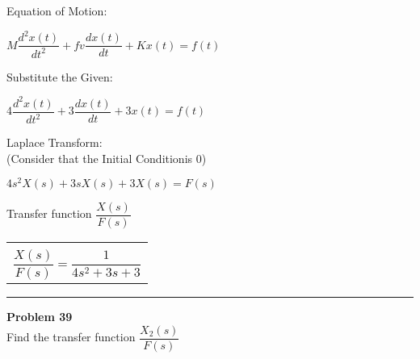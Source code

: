 \documentclass[11pt,letterpaper]{article}
\begin{document}
Equation of Motion:\\
\begin{center}
	$M\dfrac{d^2x(t)}{dt^2}+fv\dfrac{dx(t)}{dt}+Kx(t)=f(t)$\\[12pt]
\end{center}
Substitute the Given:\\
\begin{center}
	$4\dfrac{d^2x(t)}{dt^2}+3\dfrac{dx(t)}{dt}+3x(t)=f(t)$\\[12pt]
\end{center}
Laplace Transform:\\[12pt]
(Consider that the Initial Conditionis 0)\\
\begin{center}
	$4s^2X(s)+3sX(s)+3X(s)=F(s)$\\[12pt]
\end{center}
Transfer function $\dfrac{X(s)}{F(s)}$\\
\begin{center}
	\begin{tabular}{|c|}
		\hline \\
		$\dfrac{X(s)}{F(s)}=\dfrac{1}{4s^2+3s+3}$	\\ [12pt]
	\hline
	\end{tabular}	
\end{center}

\clearpage
\rule{\textwidth}{1pt}
\textbf{Problem 39}\\
Find the transfer function $\dfrac{X_2(s)}{F(s)}$\\
\end{document}
